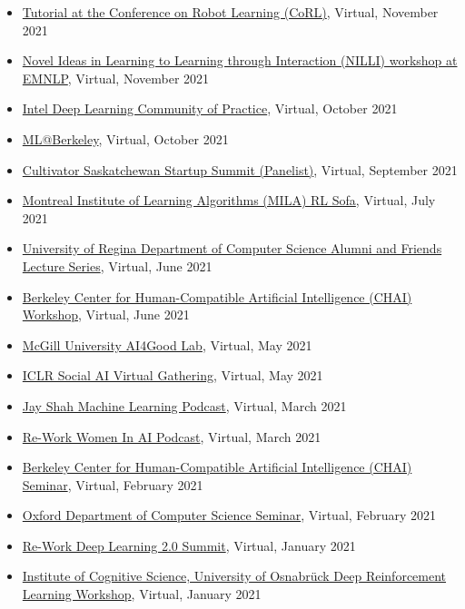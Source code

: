 \documentclass[paper=letter,fontsize=11pt]{scrartcl} %
\newcommand{\TalkEntry}[4]{
        \noindent \href{#4}{#1}, #2, #3 }
\begin{document}
\begin{itemize}
\item\TalkEntry{Tutorial at the Conference on Robot Learning (CoRL)}{Virtual}{November 2021}{https://youtu.be/5KjpZS4_RBs?t=27626}
\item\TalkEntry{Novel Ideas in Learning to Learning through Interaction (NILLI) workshop at EMNLP}{Virtual}{November 2021}{https://www.cs.mcgill.ca/~pparth2/nilli_workshop/}
\item\TalkEntry{Intel Deep Learning Community of Practice}{Virtual}{October 2021}{https://youtu.be/TggAeE1wjVI}
\item\TalkEntry{ML@Berkeley}{Virtual}{October 2021}{}
\item\TalkEntry{Cultivator Saskatchewan Startup Summit (Panelist)}{Virtual}{September 2021}{}
\item\TalkEntry{Montreal Institute of Learning Algorithms (MILA) RL Sofa}{Virtual}{July 2021}{https://bluejeans.com/s/mw4d0UxFM_J/}
\item\TalkEntry{University of Regina Department of Computer Science Alumni and Friends Lecture Series}{Virtual}{June 2021}{https://www.uregina.ca/science/cs/events/2021/06/social-reinforcement-learning-vl.html}
\item\TalkEntry{Berkeley Center for Human-Compatible Artificial Intelligence (CHAI) Workshop}{Virtual}{June 2021}{}
\item\TalkEntry{McGill University AI4Good Lab}{Virtual}{May 2021}{https://www.ai4goodlab.com/montreal-program}
\item\TalkEntry{ICLR Social AI Virtual Gathering}{Virtual}{May 2021}{https://iclr.cc/virtual/2021/social/4423}
\item\TalkEntry{Jay Shah Machine Learning Podcast}{Virtual}{March 2021}{https://www.youtube.com/watch?v=8XpCnmvq49s}
\item\TalkEntry{Re-Work Women In AI Podcast}{Virtual}{March 2021}{https://www.youtube.com/watch?v=_gLU5Uw4TWU}
\item\TalkEntry{Berkeley Center for Human-Compatible Artificial Intelligence (CHAI) Seminar}{Virtual}{February 2021}{}
\item\TalkEntry{Oxford Department of Computer Science Seminar}{Virtual}{February 2021}{http://www.cs.ox.ac.uk/seminars/2371.html}
\item\TalkEntry{Re-Work Deep Learning 2.0 Summit}{Virtual}{January 2021}{https://www.re-work.co/events/reinforcement-learning-summit}%
\item\TalkEntry{Institute of Cognitive Science, University of Osnabrück Deep Reinforcement Learning Workshop}{Virtual}{January 2021}{https://www.youtube.com/watch?list=PLlVUF9l2EowbdI05VOaMp73p-TtZjQW7A&v=G__GZKNhvsU&feature=emb_logo}

\end{itemize}
\end{document}
